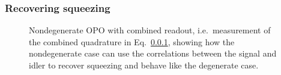 \subsubsection{Recovering squeezing}

\begin{figure}
	\centering
	\caption{Nondegenerate OPO with combined readout, i.e.\ measurement of the combined quadrature in Eq.~\ref{}, showing how the nondegenerate case can use the correlations between the signal and idler to recover squeezing and behave like the degenerate case.}
	\label{fig:nOPO_combined_readout}
\end{figure}

